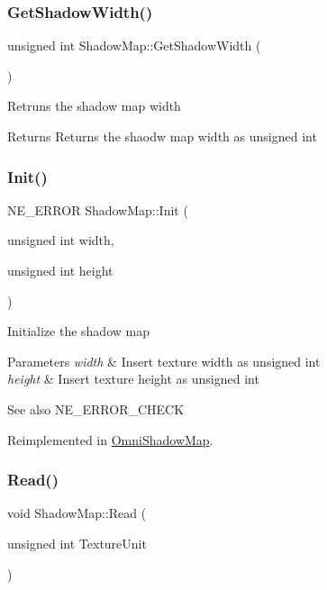 \subsubsection{\texorpdfstring{GetShadowWidth()}{GetShadowWidth()}}
{\footnotesize\ttfamily unsigned int Shadow\+Map\+::\+Get\+Shadow\+Width (\begin{DoxyParamCaption}{ }\end{DoxyParamCaption})\hspace{0.3cm}{\ttfamily [inline]}}

Retruns the shadow map width \begin{DoxyReturn}{Returns}
Returns the shaodw map width as unsigned int 
\end{DoxyReturn}
\mbox{\label{class_shadow_map_ad622c961f2cdc0ba2cbe24a759eb690b}} 
\subsubsection{\texorpdfstring{Init()}{Init()}}
{\footnotesize\ttfamily N\+E\+\_\+\+E\+R\+R\+OR Shadow\+Map\+::\+Init (\begin{DoxyParamCaption}\item[{unsigned int}]{width,  }\item[{unsigned int}]{height }\end{DoxyParamCaption})\hspace{0.3cm}{\ttfamily [virtual]}}

Initialize the shadow map 
\begin{DoxyParams}{Parameters}
{\em width} & Insert texture width as unsigned int \\
\hline
{\em height} & Insert texture height as unsigned int \\
\hline
\end{DoxyParams}
\begin{DoxySeeAlso}{See also}
N\+E\+\_\+\+E\+R\+R\+O\+R\+\_\+\+C\+H\+E\+CK 
\end{DoxySeeAlso}


Reimplemented in \mbox{\hyperlink{class_omni_shadow_map_a3236b048abb7375dc0d43852a37f4739}{Omni\+Shadow\+Map}}.

\mbox{\label{class_shadow_map_a6b48e98aeab56d0c9bf4c2ac4beeb3db}} 
\subsubsection{\texorpdfstring{Read()}{Read()}}
{\footnotesize\ttfamily void Shadow\+Map\+::\+Read (\begin{DoxyParamCaption}\item[{unsigned int}]{Texture\+Unit }\end{DoxyParamCaption})\hspace{0.3cm}{\ttfamily [virtual]}}

